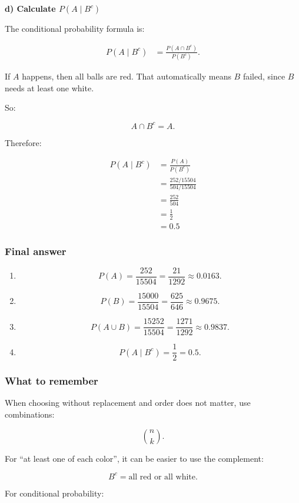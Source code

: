 \documentclass[10pt]{article}
\begin{document}
\textbf{d) Calculate $P(A\mid B^c)$}

The conditional probability formula is:

\begin{align*}
P(A\mid B^c)
&=
\frac{P(A\cap B^c)}
{P(B^c)}.
\end{align*}

If $A$ happens, then all balls are red.
That automatically means $B$ failed, since $B$ needs at least
one white.

So:

\[
A\cap B^c=A.
\]

Therefore:

\begin{align*}
P(A\mid B^c)
&=
\frac{P(A)}{P(B^c)} \\[2mm]
&=
\frac{252/15504}{504/15504} \\[2mm]
&=
\frac{252}{504} \\[2mm]
&=
\frac{1}{2} \\[2mm]
&=0.5
\end{align*}

\subsubsection*{Final answer}
\begin{enumerate}[label=\alph*)]
\item
\[
P(A)=\frac{252}{15504}
=\frac{21}{1292}
\approx 0.0163.
\]

\item
\[
P(B)=\frac{15000}{15504}
=\frac{625}{646}
\approx 0.9675.
\]

\item
\[
P(A\cup B)
=\frac{15252}{15504}
=\frac{1271}{1292}
\approx 0.9837.
\]

\item
\[
P(A\mid B^c)=\frac{1}{2}=0.5.
\]
\end{enumerate}

\subsubsection*{What to remember}
When choosing without replacement and order does not matter,
use combinations:

\[
\binom{n}{k}.
\]

For ``at least one of each color'', it can be easier to use
the complement:

\[
B^c=\text{all red or all white}.
\]

For conditional probability:
\end{document}
